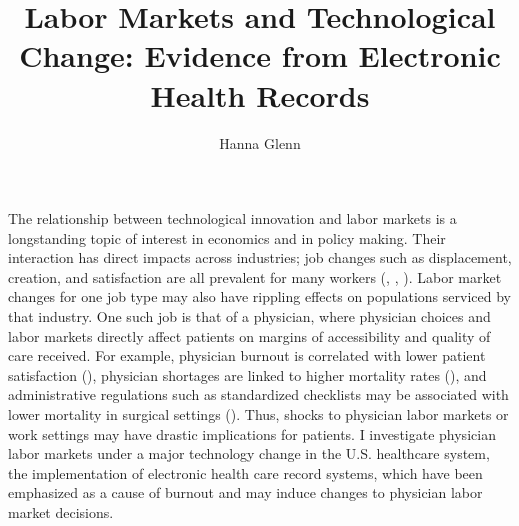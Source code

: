 \documentclass[11pt]{article}
\title{Labor Markets and Technological Change: Evidence from Electronic Health Records}
\author{Hanna Glenn}
\begin{document}
\maketitle



\vspace{1.5cm}

The relationship between technological innovation and labor markets is a longstanding topic of interest in economics and in policy making. Their interaction has direct impacts across industries; job changes such as displacement, creation, and satisfaction are all prevalent for many workers (\cite{autor2003skill}, \cite{fallick1996review}, \cite{akerlof1988job}). Labor market changes for one job type may also have rippling effects on populations serviced by that industry. One such job is that of a physician, where physician choices and labor markets directly affect patients on margins of accessibility and quality of care received. For example, physician burnout is correlated with lower patient satisfaction (\cite{shanafelt2002burnout}), physician shortages are linked to higher mortality rates (\cite{gong2019higher}), and administrative regulations such as standardized checklists may be associated with lower mortality in surgical settings (\cite{treadwell2014surgical}). Thus, shocks to physician labor markets or work settings may have drastic implications for patients. I investigate physician labor markets under a major technology change in the U.S. healthcare system, the implementation of electronic health care record systems, which have been emphasized as a cause of burnout and may induce changes to physician labor market decisions.
\end{document}
